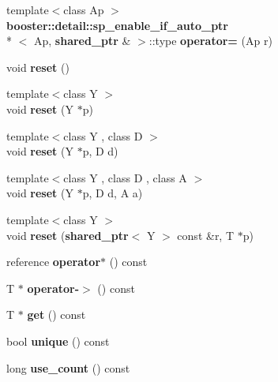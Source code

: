 \begin{DoxyCompactItemize}
\item 
{\footnotesize template$<$class Ap $>$ }\\{\bf booster\-::detail\-::sp\-\_\-enable\-\_\-if\-\_\-auto\-\_\-ptr}\\*
$<$ Ap, {\bf shared\-\_\-ptr} \& $>$\-::type {\bfseries operator=} (Ap r)\label{classbooster_1_1shared__ptr_af5a66535e99a277e8978907cca6fff94}

\item 
void {\bfseries reset} ()\label{classbooster_1_1shared__ptr_a717dbef22f028012e7add2674b87729d}

\item 
{\footnotesize template$<$class Y $>$ }\\void {\bfseries reset} (Y $\ast$p)\label{classbooster_1_1shared__ptr_a4f4524d782c5e6a87ba28607bc99674e}

\item 
{\footnotesize template$<$class Y , class D $>$ }\\void {\bfseries reset} (Y $\ast$p, D d)\label{classbooster_1_1shared__ptr_aa04c7a4f022b560408d66518b7c116ff}

\item 
{\footnotesize template$<$class Y , class D , class A $>$ }\\void {\bfseries reset} (Y $\ast$p, D d, A a)\label{classbooster_1_1shared__ptr_acff6191062f3a6ba1c4cf4bb8477ea11}

\item 
{\footnotesize template$<$class Y $>$ }\\void {\bfseries reset} ({\bf shared\-\_\-ptr}$<$ Y $>$ const \&r, T $\ast$p)\label{classbooster_1_1shared__ptr_a982b7dd9a9897bc539194c0a69f56851}

\item 
reference {\bfseries operator$\ast$} () const \label{classbooster_1_1shared__ptr_a41d1cb065b9e10152333148be2124d59}

\item 
T $\ast$ {\bfseries operator-\/$>$} () const \label{classbooster_1_1shared__ptr_ab2f5866801861c8a80468d28be225459}

\item 
T $\ast$ {\bfseries get} () const \label{classbooster_1_1shared__ptr_a0b3b71ea33c2284ae4fc52c350ff19b4}

\item 
bool {\bfseries unique} () const \label{classbooster_1_1shared__ptr_a852bb19a9dbba89a526c3f10bee70489}

\item 
long {\bfseries use\-\_\-count} () const \label{classbooster_1_1shared__ptr_a99907f1bd1bc3b992d091b78455ca17c}


\end{DoxyCompactItemize}
